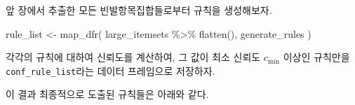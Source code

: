 \documentclass[
]{book}
\newenvironment{Shaded}{\begin{snugshade}}{\end{snugshade}}
\newcommand{\AttributeTok}[1]{\textcolor[rgb]{0.77,0.63,0.00}{#1}}
\newcommand{\ControlFlowTok}[1]{\textcolor[rgb]{0.13,0.29,0.53}{\textbf{#1}}}
\newcommand{\FloatTok}[1]{\textcolor[rgb]{0.00,0.00,0.81}{#1}}
\newcommand{\FunctionTok}[1]{\textcolor[rgb]{0.00,0.00,0.00}{#1}}
\newcommand{\NormalTok}[1]{#1}
\newcommand{\OtherTok}[1]{\textcolor[rgb]{0.56,0.35,0.01}{#1}}
\newcommand{\SpecialCharTok}[1]{\textcolor[rgb]{0.00,0.00,0.00}{#1}}
\newcommand{\StringTok}[1]{\textcolor[rgb]{0.31,0.60,0.02}{#1}}
\begin{document}
앞 장에서 추출한 모든 빈발항목집합들로부터 규칙을 생성해보자.

\begin{Shaded}
\begin{Highlighting}[]
\NormalTok{rule\_list }\OtherTok{\textless{}{-}} \FunctionTok{map\_dfr}\NormalTok{(}
\NormalTok{  large\_itemsets }\SpecialCharTok{\%\textgreater{}\%} \FunctionTok{flatten}\NormalTok{(),}
\NormalTok{  generate\_rules}
\NormalTok{)}
\end{Highlighting}
\end{Shaded}

각각의 규칙에 대하여 신뢰도를 계산하여, 그 값이 최소 신뢰도 \(c_{\text{min}}\) 이상인 규칙만을 \texttt{conf\_rule\_list}라는 데이터 프레임으로 저장하자.

\begin{Shaded}
\end{Shaded}

이 결과 최종적으로 도출된 규칙들은 아래와 같다.
\end{document}

